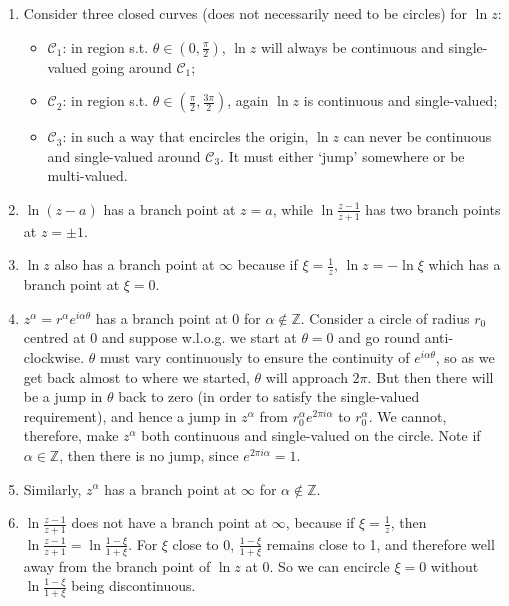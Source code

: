 \documentclass[a4paper]{article}
\begin{document}
\begin{eg}\leavevmode
\begin{center}
\end{center}
\begin{enumerate}
    \item Consider three closed curves (does not necessarily need to be circles) for $\ln z$:
    \begin{itemize}
        \item $\mathcal{C}_1$: in region s.t. $\theta\in(0,\frac{\pi}{2})$, $\ln z$ will always be continuous and single-valued going around $\mathcal{C}_1$;
        \item $\mathcal{C}_2$: in region s.t. $\theta\in(\frac{\pi}{2},\frac{3\pi}{2})$, again $\ln z$ is continuous and single-valued;
        \item $\mathcal{C}_3$: in such a way that encircles the origin, $\ln z$ can never be continuous and single-valued around $\mathcal{C}_3$. It must either `jump' somewhere or be multi-valued.
    \end{itemize}

    \item $\ln(z-a)$ has a branch point at $z=a$, while $\ln\frac{z-1}{z+1}$ has two branch points at $z=\pm 1$.
    \item $\ln z$ also has a branch point at $\infty$ because if $\xi=\frac{1}{z}$, $\ln z=-\ln\xi$ which has a branch point at $\xi=0$.
    \item $z^\alpha=r^\alpha e^{i\alpha\theta}$ has a branch point at 0 for $\alpha\notin\mathbb{Z}$. Consider a circle of radius $r_0$ centred at 0 and suppose w.l.o.g. we start at $\theta=0$ and go round anti-clockwise. $\theta$ must vary continuously to ensure the continuity of $e^{i\alpha\theta}$, so as we get back almost to where we started, $\theta$ will approach $2\pi$. But then there will be a jump in $\theta$ back to zero (in order to satisfy the single-valued requirement), and hence a jump in $z^\alpha$ from $r_0^\alpha e^{2\pi i\alpha}$ to $r_0^\alpha$. We cannot, therefore, make $z^\alpha$ both continuous and single-valued on the circle. Note if $\alpha\in\mathbb{Z}$, then there is no jump, since $e^{2\pi i\alpha}=1$.
    \item Similarly, $z^\alpha$ has a branch point at $\infty$ for $\alpha\notin\mathbb{Z}$.
    \item $\ln\frac{z-1}{z+1}$ does not have a branch point at $\infty$, because if $\xi=\frac{1}{z}$, then $\ln\frac{z-1}{z+1}=\ln\frac{1-\xi}{1+\xi}$. For $\xi$ close to 0, $\frac{1-\xi}{1+\xi}$ remains close to 1, and therefore well away from the branch point of $\ln z$ at 0. So we can encircle $\xi=0$ without $\ln\frac{1-\xi}{1+\xi}$ being discontinuous.
\end{enumerate}
\end{eg}
\end{document}
